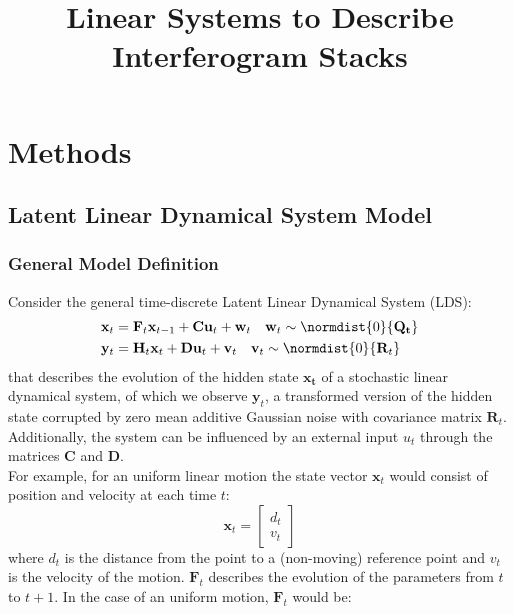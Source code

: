 \documentclass{article}
\title{Linear Systems to Describe Interferogram Stacks}
\begin{document}
\maketitle

\section{Methods}
\subsection{Latent Linear Dynamical System Model }\label{sec:displacement_model}
\subsubsection{General Model Definition}
Consider the general time-discrete Latent Linear Dynamical System (LDS)\cite{Barber2011}:
\begin{equation}\label{eq:state_recursion}
	\begin{aligned}
		\mathbf{x}_t &= \mathbf{F}_t \mathbf{x}_{t-1} + \mathbf{C} \mathbf{u}_t + \mathbf{w}_t \quad \mathbf{w}_t \sim \normdist{0}{\mathbf{Q_t}} \\
		\mathbf{y}_{t} &= \mathbf{H}_{t}  \mathbf{x}_{t} +  \mathbf{D} \mathbf{u}_t + \mathbf{v}_t \quad \mathbf{v}_t   \sim \normdist{0}{\mathbf{R}_t}
	\end{aligned}
\end{equation}
that describes the evolution of the hidden state $\mathbf{x_t}$ of a stochastic linear dynamical system, of which we observe $\mathbf{y}_t$, a transformed version of the hidden state corrupted by zero mean additive Gaussian noise with covariance matrix $\mathbf{R}_t$. Additionally, the system can be influenced by an external input $u_{t}$ through the matrices $\mathbf{C}$ and $\mathbf{D}$. \\
For example, for an uniform linear motion the state vector $\mathbf{x}_t$ would consist of position and velocity at each time $t$:
\begin{equation}\label{eq:simplified_state}
\mathbf{x}_t = 
	\begin{bmatrix}
		d_{t}\\
		v_{t}
	\end{bmatrix}
\end{equation}
where $d_t$ is the distance from the point to a (non-moving) reference point and $v_t$ is the velocity of the motion. $\mathbf{F}_t$ describes the evolution of the parameters from $t$ to $t+1$. In the case of an uniform motion, $\mathbf{F}_t$ would be: 
\end{document}
